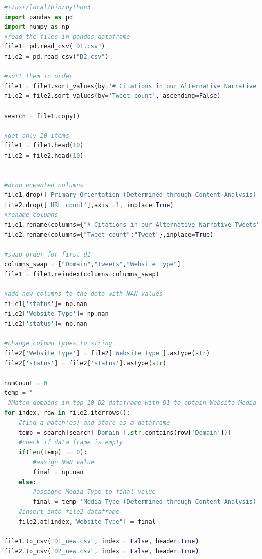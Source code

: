 \documentclass[12pt]{article}
\begin{document}
\begin{lstlisting}[language=Python, caption=one.py , label=lst:copy]
#!/usr/local/bin/python3
import pandas as pd
import numpy as np
#read the files in pandas dataframe
file1= pd.read_csv("D1.csv")
file2 = pd.read_csv("D2.csv")

#sort them in order
file1 = file1.sort_values(by='# Citations in our Alternative Narrative Tweets',ascending=False)
file2 = file2.sort_values(by='Tweet count', ascending=False)

search = file1.copy()

#get only 10 items
file1 = file1.head(10)
file2 = file2.head(10)


#drop unwanted columns
file1.drop(['Primary Orientation (Determined through Content Analysis)', 'How Cited in Alternative Narrative of Shooting Events'],axis= 1,inplace=True)
file2.drop(['URL count'],axis =1, inplace=True)
#rename columns
file1.rename(columns={"# Citations in our Alternative Narrative Tweets":"Tweets","Media Type (Determined through Content Analysis)":"Website Type"},inplace=True)
file2.rename(columns={"Tweet count":"Tweet"},inplace=True)

#swap order for first d1
columns_swap = ["Domain","Tweets","Website Type"]
file1 = file1.reindex(columns=columns_swap)

#add new columns to the data with NAN values
file1['status']= np.nan
file2['Website Type']= np.nan
file2['status']= np.nan

#change column types to string
file2['Website Type'] = file2['Website Type'].astype(str)
file2['status'] = file2['status'].astype(str)

numCount = 0
temp =""
 #Match domains in top 10 D2 dataframe with D1 to obtain Website Media Type
for index, row in file2.iterrows():
    #find a match(es) and store as a dataframe
    temp = search[search['Domain'].str.contains(row['Domain'])]
    #check if data frame is empty
    if(len(temp) == 0):
        #assign NaN value
        final = np.nan
    else:
        #assigne Media Type to final value
        final = temp['Media Type (Determined through Content Analysis)'].iloc[0]
    #insert into file2 dataframe
    file2.at[index,"Website Type"] = final

file1.to_csv("D1_new.csv", index = False, header=True)
file2.to_csv("D2_new.csv", index = False, header=True)

\end{lstlisting}

\clearpage
\end{document}
